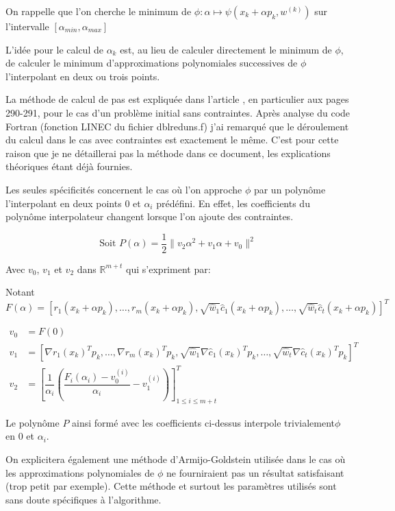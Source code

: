 \documentclass[a4paper,11pt]{article}
\newcommand{\hc}{\hat{c}}
\numberwithin{equation}{section}
\begin{document}
On rappelle que l'on cherche le minimum de $\phi: \alpha \mapsto \psi(x_{k}+\alpha p_{k},w^{(k)})$ sur l'intervalle $[\alpha_{min},\alpha_{max}]$

L'idée pour le calcul de $\alpha_{k}$ est, au lieu de calculer directement le minimum de $\phi$, de calculer le minimum d'approximations polynomiales successives de $\phi$ l'interpolant en deux ou trois points. 

La méthode de calcul de pas est expliquée dans l'article \cite{lindstromwedin1984}, en particulier aux pages 290-291, pour le cas d'un problème initial sans contraintes. Après analyse du code Fortran (fonction LINEC du fichier dblreduns.f) j'ai remarqué que le déroulement du calcul dans le cas avec contraintes est exactement le même. C'est pour cette raison que je ne détaillerai pas la méthode dans ce document, les explications théoriques étant déjà fournies.


Les seules spécificités concernent le cas où l'on approche $\phi$ par un polynôme l'interpolant en deux points $0$ et $\alpha_{i}$ prédéfini. En effet, les coefficients du polynôme interpolateur changent lorsque l'on ajoute des contraintes.

$$\text{Soit }P(\alpha) = \dfrac{1}{2}\|v_2\alpha^2 + v_1\alpha + v_0\|^2$$

Avec $v_0$, $v_1$ et $v_2$ dans $\mathbb{R}^{m+t}$ qui s'expriment par: 

Notant $F(\alpha) = \left[r_1(x_{k}+\alpha p_{k}), \ldots, r_m(x_{k}+\alpha p_{k}), \sqrt{\hat{w}_1}\hc_1(x_{k}+\alpha p_{k}), \ldots, \sqrt{\hat{w}_t}\hc_t(x_{k}+\alpha p_{k})\right]^{T}$

$$\begin{aligned}
v_0 &= F(0) \\
v_1 &= \left[\nabla r_1(x_{k})^Tp_{k},\ldots, \nabla r_m(x_{k})^Tp_{k}, \sqrt{\hat{w}_1}\nabla \hc_1(x_{k})^Tp_{k}, \ldots, \sqrt{\hat{w}_t}\nabla \hc_t(x_{k})^Tp_{k} \right]^T \\
v_2 &= \left[ \dfrac{1}{\alpha_i}\left( \dfrac{F_i(\alpha_i) - v_0^{(i)}}{\alpha_i} - v_1^{(i)}\right)\right]_{1 \leq i \leq m+t}^T
\end{aligned}$$

Le polynôme $P$ ainsi formé avec les coefficients ci-dessus interpole trivialement$\phi$ en $0$ et $\alpha_i$.


On explicitera également une méthode d'Armijo-Goldstein utilisée dans le cas où les approximations polynomiales de $\phi$ ne fourniraient pas un résultat satisfaisant (trop petit par exemple). Cette méthode et surtout les paramètres utilisés sont sans doute spécifiques à l'algorithme. 
\end{document}
